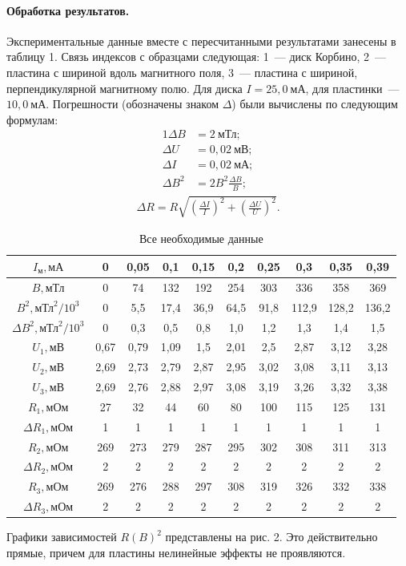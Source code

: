 \documentclass[12pt,a4paper]{article}
\begin{document}
\paragraph{Обработка результатов.} Экспериментальные данные вместе с пересчитанными результатами занесены в таблицу 1. Связь индексов с образцами следующая: 1~--- диск Корбино, 2~--- пластина с шириной вдоль магнитного поля, 3~--- пластина с шириной, перпендикулярной магнитному полю. Для диска $I = 25,0~\text{мА}$, для пластинки~--- $10,0~\text{мА}$. Погрешности (обозначены знаком $\Delta$) были вычислены по следующим формулам:
\begin{alignat}{1}
\Delta B &= 2~\text{мТл}; \\
\Delta U &= 0,02~\text{мВ}; \\
\Delta I &= 0,02~\text{мА}; \\ 
\Delta B^2 &= 2B^2\frac{\Delta B}{B}; 
\end{alignat}
\begin{gather}
\Delta R = R\sqrt{\left(\frac{\Delta I}{I}\right)^2 + \left(\frac{\Delta U}{U}\right)^2}.
\end{gather}
\begin{table}[h!]\centering
\begin{tabular}{|*{10}{c|}}
\hline
$I_\text{м}, \text{мА}$&0&0,05&0,1&0,15&0,2&0,25&0,3&0,35&0,39\\
\hline
$B, \text{мТл}$&0&74&132&192&254&303&336&358&369\\
\hline
$B^2, \text{мТл}^2/10^3$&0&5,5&17,4&36,9&64,5&91,8&112,9&128,2&136,2\\
\hline
$\Delta B^2, \text{мТл}^2/10^3$&0&0,3&0,5&0,8&1,0&1,2&1,3&1,4&1,5\\
\hline
$U_1, \text{мВ}$&0,67&0,79&1,09&1,5&2,01&2,5&2,87&3,12&3,28\\
\hline
$U_2, \text{мВ}$&2,69&2,73&2,79&2,87&2,95&3,02&3,08&3,11&3,13\\
\hline
$U_3, \text{мВ}$&2,69&2,76&2,88&2,97&3,08&3,19&3,26&3,32&3,38\\
\hline
$R_1, \text{мОм}$&27&32&44&60&80&100&115&125&131\\
\hline
$\Delta R_1, \text{мОм}$&1&1&1&1&1&1&1&1&1\\
\hline
$R_2, \text{мОм}$&269&273&279&287&295&302&308&311&313\\
\hline
$\Delta R_2, \text{мОм}$&2&2&2&2&2&2&2&2&2\\
\hline
$R_3, \text{мОм}$&269&276&288&297&308&319&326&332&338\\
\hline
$\Delta R_3, \text{мОм}$&2&2&2&2&2&2&2&2&2\\
\hline
\end{tabular}
\caption{Все необходимые данные}
\end{table}

\noindent Графики зависимостей $R\left(B\right)^2$ представлены на рис. 2. Это действительно прямые, причем для пластины нелинейные эффекты не проявляются.
\end{document}
